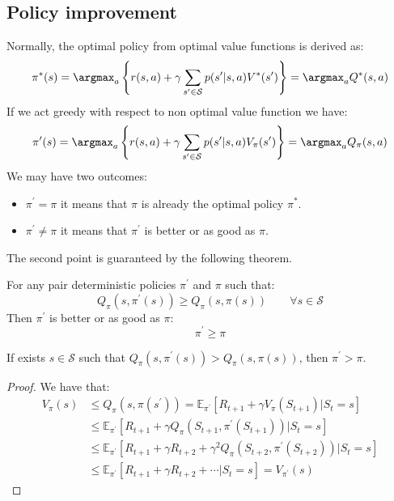 \subsection{Policy improvement}
Normally, the optimal policy from optimal value functions is derived as: 
\[\pi^\ast(s)=\argmax_a\left\{r(s,a)+\gamma\sum_{s^\prime\in\mathcal{S}}p(s^\prime|s,a)V^\ast(s^\prime)\right\}=\argmax_aQ^\ast(s,a)\]
If we act greedy with respect to non optimal value function we have: 
\[\pi^\prime(s)=\argmax_a\left\{r(s,a)+\gamma\sum_{s^\prime\in\mathcal{S}}p(s^\prime|s,a)V_{\pi}(s^\prime)\right\}=\argmax_aQ_{\pi}(s,a)\]
We may have two outcomes: 
\begin{itemize}
    \item $\pi^\prime=\pi$ it means that $\pi$ is already the optimal policy $\pi^\ast$. 
    \item $\pi^\prime\neq\pi$ it means that $\pi^\prime$ is better or as good as $\pi$. 
\end{itemize}
The second point is guaranteed by the following theorem. 
\begin{theorem}
    For any pair deterministic policies $\pi^\prime$ and $\pi$ such that: 
    \[Q_\pi(s,\pi^\prime(s))\geq Q_{\pi}(s,\pi(s)) \qquad \forall s \in \mathcal{S}\]
    Then $\pi^\prime$ is better or as good as $\pi$: 
    \[\pi^\prime\geq\pi\]
\end{theorem}
\begin{corollary}
    If exists $s\in\mathcal{S}$ such that $Q_\pi(s,\pi^\prime(s))> Q_{\pi}(s,\pi(s))$, then $\pi^\prime>\pi$.
\end{corollary}
\begin{proof}
    We have that: 
    \begin{align*}
        V_{\pi}(s)  &\leq Q_{\pi}(s,\pi(s^\prime))=\mathbb{E}_{\pi^\prime}\left[R_{t+1}+\gamma V_{\pi}(S_{t+1})|S_t=s\right] \\
                    &\leq \mathbb{E}_{\pi^\prime}\left[R_{t+1}+\gamma Q_{\pi}(S_{t+1},\pi^\prime(S_{t+1}))|S_t=s\right] \\
                    &\leq \mathbb{E}_{\pi^\prime}\left[R_{t+1}+\gamma R_{t+2}+ \gamma^2Q_{\pi}(S_{t+2},\pi^\prime(S_{t+2}))|S_t=s\right] \\
                    &\leq \mathbb{E}_{\pi^\prime}\left[R_{t+1}+\gamma R_{t+2}+ \cdots|S_t=s\right]=V_{\pi^\prime}(s)
    \end{align*}
\end{proof}

